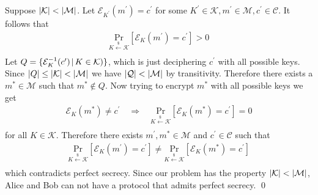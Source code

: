 \documentclass[12pt]{article}
\DeclarePairedDelimiter \abs{\lvert}{\rvert}%
\theoremstyle{remark}
\begin{document}
Suppose $\abs{\mathcal{K}} < \abs{\mathcal{M}}$. Let $\mathcal{E}_{K^\prime}(m^\prime) = c^\prime$ for some $K^\prime \in \mathcal{K}, m^\prime \in \mathcal{M}, c^\prime \in \mathcal{C}$. It follows that 
\begin{align}
\underset{K \xleftarrow[]{\$} \mathcal{K}}{\text{Pr}}[\mathcal{E}_K(m^\prime) = c^\prime] > 0
\end{align}
Let $Q = \{\mathcal{E}_K^{-1}(c^\prime) \hspace{.05cm} \vert \hspace{.05cm} K \in \mathcal{K})\}$, which is just deciphering $c^\prime$ with all possible keys. Since $\abs{Q} \leq \abs{\mathcal{K}} < \abs{\mathcal{M}}$ we have $\abs{\mathcal{Q}} < \abs{\mathcal{M}}$ by transitivity. Therefore there exists a $m^* \in \mathcal{M}$ such that $m^* \not\in Q$. Now trying to encrypt $m^*$ with all possible keys we get 
\begin{align}
	\mathcal{E}_K(m^*) \neq c^\prime \quad \Rightarrow \quad 
	\underset{K \xleftarrow[]{\$} \mathcal{K}}{\text{Pr}}[\mathcal{E}_K(m^*) = c^\prime] = 0
\end{align}
for all $K \in \mathcal{K}$. Therefore there exists $m^\prime, m^* \in \mathcal{M}$ and $c^\prime \in \mathcal{C}$ such that 
\begin{align}
	\underset{K \xleftarrow[]{\$} \mathcal{K}}{\text{Pr}}[\mathcal{E}_K(m^\prime) = c^\prime] \neq
	\underset{K \xleftarrow[]{\$} \mathcal{K}}{\text{Pr}}[\mathcal{E}_K(m^*) = c^\prime]
\end{align} 
which contradicts perfect secrecy. Since our problem has the property $\abs{\mathcal{K}} < \abs{\mathcal{M}}$, Alice and Bob can not have a protocol that admits perfect secrecy. \qed
\end{document}
